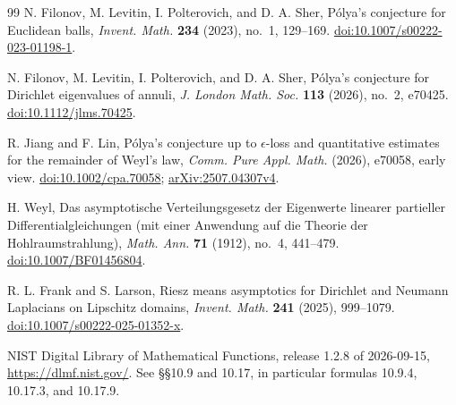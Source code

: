 \documentclass[11pt,reqno]{amsart}
\numberwithin{equation}{section}
\begin{document}
\begin{thebibliography}{99}
N. Filonov, M. Levitin, I. Polterovich, and D. A. Sher,
P\'olya's conjecture for Euclidean balls,
\emph{Invent. Math.} \textbf{234} (2023), no.~1, 129--169.
\href{https://doi.org/10.1007/s00222-023-01198-1}{doi:10.1007/s00222-023-01198-1}.

N. Filonov, M. Levitin, I. Polterovich, and D. A. Sher,
P\'olya's conjecture for Dirichlet eigenvalues of annuli,
\emph{J. London Math. Soc.} \textbf{113} (2026), no.~2, e70425.
\href{https://doi.org/10.1112/jlms.70425}{doi:10.1112/jlms.70425}.

R. Jiang and F. Lin,
P\'olya's conjecture up to $\epsilon$-loss and quantitative estimates
for the remainder of Weyl's law,
\emph{Comm. Pure Appl. Math.} (2026), e70058, early view.
\href{https://doi.org/10.1002/cpa.70058}{doi:10.1002/cpa.70058};
\href{https://arxiv.org/abs/2507.04307v4}{arXiv:2507.04307v4}.

H. Weyl,
Das asymptotische Verteilungsgesetz der Eigenwerte linearer partieller
Differentialgleichungen (mit einer Anwendung auf die Theorie der Hohlraumstrahlung),
\emph{Math. Ann.} \textbf{71} (1912), no.~4, 441--479.
\href{https://doi.org/10.1007/BF01456804}{doi:10.1007/BF01456804}.

R. L. Frank and S. Larson,
Riesz means asymptotics for Dirichlet and Neumann Laplacians on Lipschitz domains,
\emph{Invent. Math.} \textbf{241} (2025), 999--1079.
\href{https://doi.org/10.1007/s00222-025-01352-x}{doi:10.1007/s00222-025-01352-x}.

NIST Digital Library of Mathematical Functions,
release 1.2.8 of 2026-09-15,
\url{https://dlmf.nist.gov/}.
See \S\S10.9 and 10.17, in particular formulas 10.9.4, 10.17.3, and 10.17.9.
\end{thebibliography}
\end{document}
